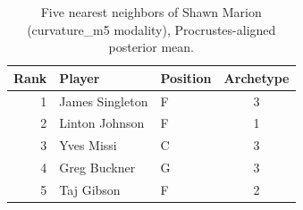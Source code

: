 \begin{table}[htbp]
  \centering\small
  \begin{tabular}{rllc}
    \toprule
    Rank & Player & Position & Archetype \\
    \midrule
    1 & James Singleton & F & 3 \\
    2 & Linton Johnson & F & 1 \\
    3 & Yves Missi & C & 3 \\
    4 & Greg Buckner & G & 3 \\
    5 & Taj Gibson & F & 2 \\
    \bottomrule
  \end{tabular}
  \caption{Five nearest neighbors of Shawn Marion (curvature_m5 modality), Procrustes-aligned posterior mean.}
  \label{tab:Shawn_Marion_neighbors_curvature_m5}
\end{table}

